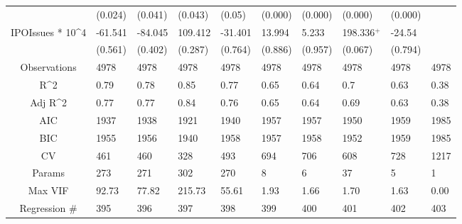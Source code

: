 \documentclass{article}
\begin{document}
\begin{table}[H]
\begin{tabular}{|clllllllll|}
   & (0.024) & (0.041) & (0.043) & (0.05) & (0.000) & (0.000) & (0.000) & (0.000) &  \\ 
  IPOIssues * 10^4 & -61.541 & -84.045 & 109.412 & -31.401 & 13.994 & 5.233 & 198.336$^{+}$ & -24.54 &  \\ 
   & (0.561) & (0.402) & (0.287) & (0.764) & (0.886) & (0.957) & (0.067) & (0.794) &  \\ 
  \hline 
 Observations & 4978 & 4978 & 4978 & 4978 & 4978 & 4978 & 4978 & 4978 & 4978 \\ 
  R^2 & 0.79 & 0.78 & 0.85 & 0.77 & 0.65 & 0.64 & 0.7 & 0.63 & 0.38 \\ 
  Adj R^2 & 0.77 & 0.77 & 0.84 & 0.76 & 0.65 & 0.64 & 0.69 & 0.63 & 0.38 \\ 
  AIC & 1937 & 1938 & 1921 & 1940 & 1957 & 1957 & 1950 & 1959 & 1985 \\ 
  BIC & 1955 & 1956 & 1940 & 1958 & 1957 & 1958 & 1952 & 1959 & 1985 \\ 
  CV & 461 & 460 & 328 & 493 & 694 & 706 & 608 & 728 & 1217 \\ 
  Params & 273 & 271 & 302 & 270 & 8 & 6 & 37 & 5 & 1 \\ 
  Max VIF & 92.73 & 77.82 & 215.73 & 55.61 & 1.93 & 1.66 & 1.70 & 1.63 & 0.00 \\ 
  Regression \# & 395 & 396 & 397 & 398 & 399 & 400 & 401 & 402 & 403 \\ 
   \hline
\end{tabular}
 
\end{table}
\end{document}
